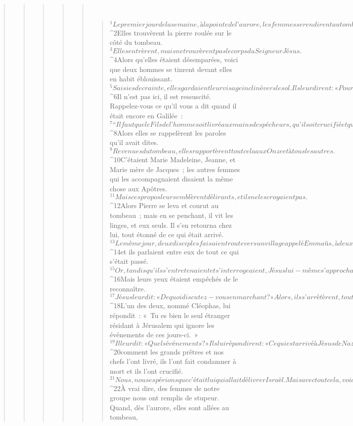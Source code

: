 \begin{verse}
\begin{verse}
\begin{verse}
\begin{verse}
\begin{verse}
         
      \bchapter{}
      \begin{verse}
${}^{1}Le premier jour de la semaine, à la pointe de l’aurore, les femmes se rendirent au tombeau, portant les aromates qu’elles avaient préparés. 
${}^{2}Elles trouvèrent la pierre roulée sur le côté du tombeau. 
${}^{3}Elles entrèrent, mais ne trouvèrent pas le corps du Seigneur Jésus. 
${}^{4}Alors qu’elles étaient désemparées, voici que deux hommes se tinrent devant elles en habit éblouissant. 
${}^{5}Saisies de crainte, elles gardaient leur visage incliné vers le sol. Ils leur dirent : « Pourquoi cherchez-vous le Vivant parmi les morts ? 
${}^{6}Il n’est pas ici, il est ressuscité. Rappelez-vous ce qu’il vous a dit quand il était encore en Galilée : 
${}^{7}“Il faut que le Fils de l’homme soit livré aux mains des pécheurs, qu’il soit crucifié et que, le troisième jour, il ressuscite.” » 
${}^{8}Alors elles se rappelèrent les paroles qu’il avait dites.
${}^{9}Revenues du tombeau, elles rapportèrent tout cela aux Onze et à tous les autres. 
${}^{10}C’étaient Marie Madeleine, Jeanne, et Marie mère de Jacques ; les autres femmes qui les accompagnaient disaient la même chose aux Apôtres. 
${}^{11}Mais ces propos leur semblèrent délirants, et ils ne les croyaient pas. 
${}^{12}Alors Pierre se leva et courut au tombeau ; mais en se penchant, il vit les linges, et eux seuls. Il s’en retourna chez lui, tout étonné de ce qui était arrivé.
${}^{13}Le même jour, deux disciples faisaient route vers un village appelé Emmaüs, à deux heures de marche de Jérusalem, 
${}^{14}et ils parlaient entre eux de tout ce qui s’était passé. 
${}^{15}Or, tandis qu’ils s’entretenaient et s’interrogeaient, Jésus lui-même s’approcha, et il marchait avec eux. 
${}^{16}Mais leurs yeux étaient empêchés de le reconnaître. 
${}^{17}Jésus leur dit : « De quoi discutez-vous en marchant ? » Alors, ils s’arrêtèrent, tout tristes. 
${}^{18}L’un des deux, nommé Cléophas, lui répondit : « Tu es bien le seul étranger résidant à Jérusalem qui ignore les événements de ces jours-ci. » 
${}^{19}Il leur dit : « Quels événements ? » Ils lui répondirent : « Ce qui est arrivé à Jésus de Nazareth, cet homme qui était un prophète puissant par ses actes et ses paroles devant Dieu et devant tout le peuple : 
${}^{20}comment les grands prêtres et nos chefs l’ont livré, ils l’ont fait condamner à mort et ils l’ont crucifié. 
${}^{21}Nous, nous espérions que c’était lui qui allait délivrer Israël. Mais avec tout cela, voici déjà le troisième jour qui passe depuis que c’est arrivé. 
${}^{22}À vrai dire, des femmes de notre groupe nous ont remplis de stupeur. Quand, dès l’aurore, elles sont allées au tombeau, 

\end{verse}
\end{verse}
\end{verse}
\end{verse}
\end{verse}
\end{verse}

